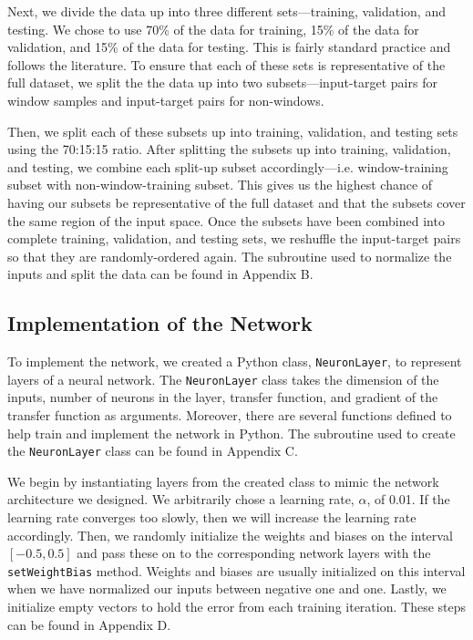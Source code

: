 \documentclass[12pt,halfline,a4paper]{ouparticle}
\begin{document}
Next, we divide the data up into three different sets---training, validation, and testing. We chose to use 70\% of the data for training, 15\% of the data for validation, and 15\% of the data for testing. This is fairly standard practice and follows the literature. To ensure that each of these sets is representative of the full dataset, we split the the data up into two subsets---input-target pairs for window samples and input-target pairs for non-windows. 

Then, we split each of these subsets up into training, validation, and testing sets using the 70:15:15 ratio. After splitting the subsets up into training, validation, and testing, we combine each split-up subset accordingly---i.e. window-training subset with non-window-training subset. This gives us the highest chance of having our subsets be representative of the full dataset and that the subsets cover the same region of the input space. Once the subsets have been combined into complete training, validation, and testing sets, we reshuffle the input-target pairs so that they are randomly-ordered again. The subroutine used to normalize the inputs and split the data can be found in Appendix B. 

\subsection{Implementation of the Network}
\label{sec5.2}
To implement the network, we created a Python class, \verb|NeuronLayer|, to represent layers of a neural network. The \verb|NeuronLayer| class takes the dimension of the inputs, number of neurons in the layer, transfer function, and gradient of the transfer function as arguments. Moreover, there are several functions defined to help train and implement the network in Python. The subroutine used to create the \verb|NeuronLayer| class can be found in Appendix C. 

We begin by instantiating layers from the created class to mimic the network architecture we designed. We arbitrarily chose a learning rate, $\alpha$, of 0.01. If the learning rate converges too slowly, then we will increase the learning rate accordingly. Then, we randomly initialize the weights and biases on the interval $[-0.5, 0.5]$ and pass these on to the corresponding network layers with the \verb|setWeightBias| method. Weights and biases are usually initialized on this interval when we have normalized our inputs between negative one and one. Lastly, we initialize empty vectors to hold the error from each training iteration. These steps can be found in Appendix D. 
\end{document}
